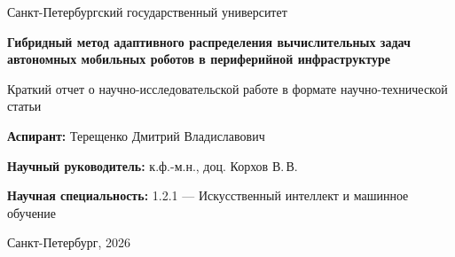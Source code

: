 \documentclass[a4paper,14pt]{extarticle}
\newcommand{\methodname}{AMPLE-AMR}
\newcommand{\clustermethodname}{C-AMPLE-AMR}
\begin{document}
\begin{center}
{\large Санкт-Петербургский государственный университет}\par
\vspace{0.8em}
{\bfseries\Large Гибридный метод адаптивного распределения вычислительных задач автономных мобильных роботов в периферийной инфраструктуре}\par
\vspace{0.8em}
{\large Краткий отчет о научно-исследовательской работе в формате научно-технической статьи}\par
\vspace{0.8em}
\textbf{Аспирант:} Терещенко Дмитрий Владиславович\par
\textbf{Научный руководитель:} к.ф.-м.н., доц. Корхов В.\,В.\par
\textbf{Научная специальность:} 1.2.1 --- Искусственный интеллект и машинное обучение\par
\vspace{0.5em}
Санкт-Петербург, 2026
\end{center}

\begin{abstract}
\noindent В работе рассматривается задача распределения вычислительных задач автономных мобильных роботов между ограниченными периферийными вычислительными узлами. Такая задача возникает в роботизированных складах и других локальных киберфизических средах, где роботы генерируют неоднородный поток задач локализации, обработки сенсорных данных, распознавания объектов, перепланирования маршрутов и обмена телеметрией. Полностью бортовая обработка ограничена энергопотреблением, массой и тепловым режимом робота, а передача всех задач в удаленное облако не гарантирует требуемую задержку. Периферийные вычисления снимают часть этих ограничений, но превращают периферийные узлы в общий дефицитный ресурс, за который конкурируют задачи разных роботов~\cite{Chaari2022RobotOffloadingSurvey,Mao2017MECPerspective,Satyanarayanan2017Emergence,Shi2016Edge,Tahir2025EdgeRoboticsSurvey}.

Предложен гибридный метод \methodname{}, объединяющий VCG-подобный аукционный слой распределения задач и кооперативное многоагентное обучение с подкреплением для выбора операционных режимов периферийных узлов~\cite{Vickrey1961Counterspeculation,Clarke1971MultipartPricing,Groves1973IncentivesTeams,Rashid2018QMIX}. Аукционный слой используется как механизм внутренней координации и оценки внешнего эффекта назначения задачи, а обучаемый контур отвечает за долговременную адаптацию к изменению нагрузки, очередей, задержек и отказов. Для крупных конфигураций предложен вариант \clustermethodname{}, локализующий распределение внутри кластеров графа периферийной инфраструктуры. Реализован программный прототип и выполнена экспериментальная проверка в домене роботизированного склада. 
\end{abstract}
\end{document}
